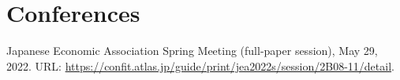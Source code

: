 \newcommand{\playsymbol}{$\blacktriangleright$}

\section{\sc Conferences}
\begin{etaremune}
\item
  Japanese Economic Association Spring Meeting (full-paper session), May 29, 2022. URL: \url{https://confit.atlas.jp/guide/print/jea2022s/session/2B08-11/detail}.
\end{etaremune}


